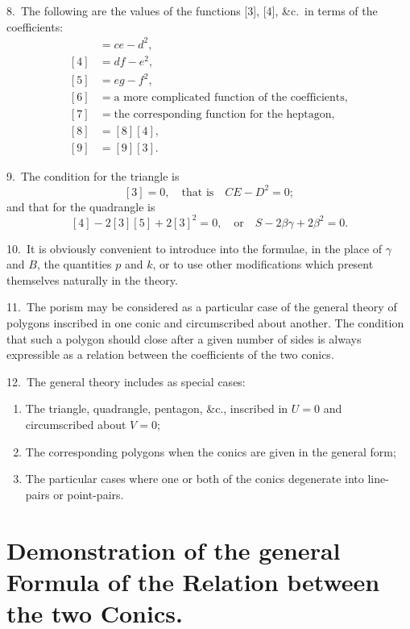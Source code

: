 \documentclass[11pt,a4paper]{book}
\begin{document}
\newpage
\setcounter{page}{313}

8.\ The following are the values of the functions [3], [4], \&c.\ in terms of the coefficients:
\begin{align*}
[3] &= ce-d^2, \\
[4] &= df-e^2, \\
[5] &= eg-f^2, \\
[6] &= \text{a more complicated function of the coefficients}, \\
[7] &= \text{the corresponding function for the heptagon}, \\
[8] &= [8][4], \\
[9] &= [9][3].
\end{align*}

9.\ The condition for the triangle is
\[
[3] = 0,\quad \text{that is}\quad CE-D^2=0;
\]
and that for the quadrangle is
\[
[4]-2[3][5]+2[3]^2=0,\quad \text{or}\quad S-2\beta\gamma+2\beta^2=0.
\]

10.\ It is obviously convenient to introduce into the formulae, in the place of $\gamma$ and $B$, the quantities $p$ and $k$, or to use other modifications which present themselves naturally in the theory.

\newpage
\setcounter{page}{314}

11.\ The porism may be considered as a particular case of the general theory of polygons inscribed in one conic and circumscribed about another. The condition that such a polygon should close after a given number of sides is always expressible as a relation between the coefficients of the two conics.

12.\ The general theory includes as special cases:
\begin{enumerate}
\item[(I.)] The triangle, quadrangle, pentagon, \&c., inscribed in $U=0$ and circumscribed about $V=0$;
\item[(II.)] The corresponding polygons when the conics are given in the general form;
\item[(III.)] The particular cases where one or both of the conics degenerate into line-pairs or point-pairs.
\end{enumerate}

\newpage
\setcounter{page}{315}

\section*{Demonstration of the general Formula of the Relation between the two Conics.}
\end{document}
